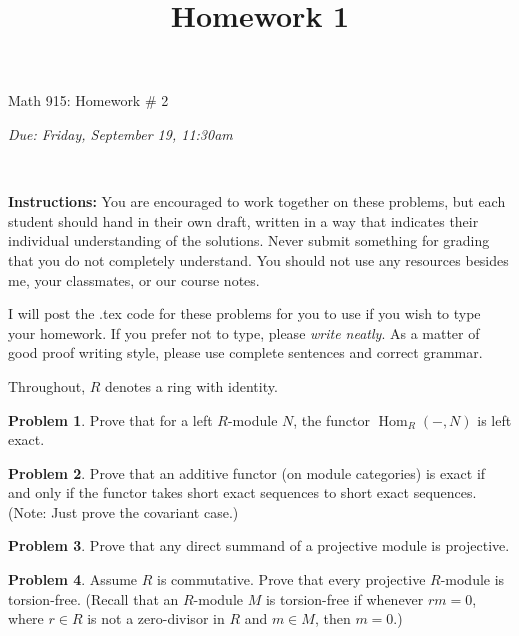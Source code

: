 \documentclass[11pt]{article}
\title{}
\date{\vspace{-0.5in}}
\title{Homework 1}
\DeclareMathOperator{\Hom}{Hom}
\theoremstyle{definition}
\newtheorem{problem}{Problem}
\begin{document}

\vspace{3em}

\begin{center}
	{\LARGE Math 915: Homework \# 2}
\end{center}
\begin{center}
{\it Due:  Friday, September 19, 11:30am}
\end{center}

\

\noindent
{\bf Instructions:}
You are encouraged to work together on these problems, but each student should hand in their own draft, written in a way that indicates their individual understanding of the solutions. Never submit something for grading that you do not completely understand. You should not use any resources besides me, your classmates, or our course notes.

\medskip
\noindent
I will post the .tex code for these problems for you to use if you wish to type your homework. If you prefer not to type, please  {\em write neatly}. As a matter of good proof writing style, please use complete sentences and correct grammar. 


\medskip
\noindent
Throughout, $R$ denotes a ring with identity.

\medskip

\begin{problem} Prove that for a left $R$-module $N$, the functor $\Hom_R(-,N)$ is left exact.  
\end{problem}

\begin{problem} Prove that an additive functor (on module categories) is exact if and only if the functor takes short exact sequences to short exact sequences.  (Note:  Just prove the covariant case.)
\end{problem}

\begin{problem} Prove that any direct summand of a projective module is projective.
\end{problem}

\begin{problem} Assume $R$ is commutative.  Prove that every projective $R$-module is torsion-free.  (Recall that an $R$-module $M$ is torsion-free if whenever $rm=0$, where $r\in R$ is not a zero-divisor in $R$ and $m\in M$, then $m=0$.)
\end{problem}
\end{document}
